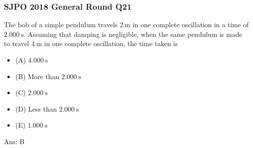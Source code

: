 \documentclass{article}
\begin{document}
\begin{samepage}
\subsubsection{SJPO 2018 General Round Q21}
The bob of a simple pendulum travels $2 \mathrm{~m}$ in one complete oscillation in a time of $2.000 \mathrm{~s}$. Assuming that damping is negligible, when the same pendulum is made to travel $4 \mathrm{~m}$ in one complete oscillation, the time taken is
\begin{itemize}
\item[](A) $4.000 \mathrm{~s}$
\item[](B) More than $2.000 \mathrm{~s}$
\item[](C) $2.000 \mathrm{~s}$
\item[](D) Less than $2.000 \mathrm{~s}$
\item[](E) $1.000 \mathrm{~s}$
\end{itemize}
Ans: \ifpaper B \fi 
\end{samepage}
\end{document}
